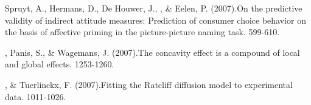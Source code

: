 \item[3.] Spruyt, A., Hermans, D., De Houwer, J., \vdkh{}, \& Eelen, P. (2007).\newblock On the predictive validity of indirect attitude measures: Prediction of consumer choice behavior on the basis of affective priming in the picture-picture naming task. 599-610. %

\item[2.] \vdkh{}, Panis, S., \& Wagemans, J. (2007).\newblock The concavity effect is a compound of local and global effects. 1253-1260. %

\item[1.] \vdkh{}, \& Tuerlinckx, F. (2007).\newblock Fitting the Ratcliff diffusion model to experimental data. 1011-1026. %
\erefs


